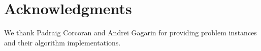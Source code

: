 \documentclass[dvipsnames,format=sigconf,anonymous=true,review=true]{acmart}
\begin{document}
\section*{Acknowledgments} 
We thank Padraig Corcoran and Andrei Gagarin for providing problem instances and their algorithm implementations. 



 
\end{document}
